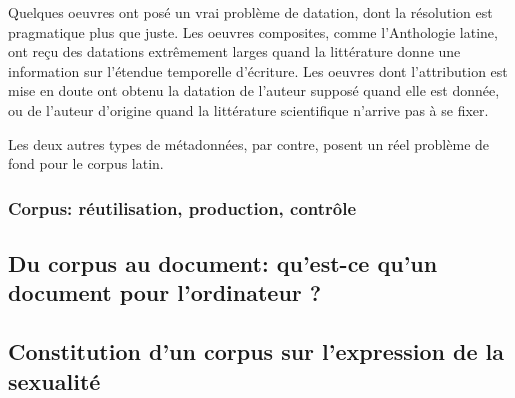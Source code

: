 Quelques oeuvres ont posé un vrai problème de datation, dont la résolution est pragmatique plus que juste. Les oeuvres composites, comme l'Anthologie latine, ont reçu des datations extrêmement larges quand la littérature donne une information sur l'étendue temporelle d'écriture. Les oeuvres dont l'attribution est mise en doute ont obtenu la datation de l'auteur supposé quand elle est donnée, ou de l'auteur d'origine quand la littérature scientifique n'arrive pas à se fixer.

Les deux autres types de métadonnées, par contre, posent un réel problème de fond pour le corpus latin.



\subsubsection{Corpus: réutilisation, production, contrôle}















\subsection{Du corpus au document: qu’est-ce qu’un document pour l’ordinateur ?}



\subsection{Constitution d’un corpus sur l’expression de la sexualité} %


